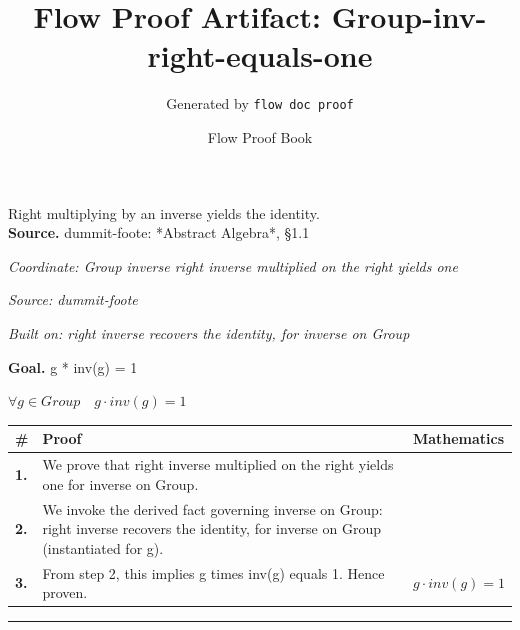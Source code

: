 \documentclass[11pt]{article}
\title{Flow Proof Artifact: Group-inv-right-equals-one}
\author{Generated by \texttt{flow doc proof}}
\date{Flow Proof Book}
\theoremstyle{definition}
\begin{document}
\maketitle
Right multiplying by an inverse yields the identity.\\[0.5em]
\textbf{Source.} dummit-foote: *Abstract Algebra*, §1.1\\[0.5em]
\bigskip
{}\par
\smallskip\noindent\textit{Coordinate: Group \cdot inverse \cdot right inverse multiplied on the right yields one}\par
\smallskip\noindent\textit{Source: dummit-foote}\par
\smallskip\noindent\textit{Built on: right inverse recovers the identity, for inverse on Group}\par
\medskip
\noindent\textbf{Goal.} g * inv(g) = 1\par
\noindent$\displaystyle \forall g \in Group\quad g \cdot inv(g) = 1$\par
\medskip
\noindent
\begin{tabular}{@{} >{\raggedright\arraybackslash}p{} >{\raggedright\arraybackslash}p{} >{\raggedleft\arraybackslash}p{} @{}}
\textbf{\#} & \textbf{Proof} & \textbf{Mathematics} \\
\midrule
\textbf{1.} & We prove that right inverse multiplied on the right yields one for inverse on Group. & \\[0.45em]
\textbf{2.} & We invoke the derived fact governing inverse on Group: right inverse recovers the identity, for inverse on Group (instantiated for g). & \\[0.45em]
\textbf{3.} & From step 2, this implies g times inv(g) equals 1. Hence proven. & $\displaystyle g \cdot inv(g) = 1$ \\[0.45em]
\bottomrule
\end{tabular}
\label{thm:Group-inverse-right_inverse_multiplied_on_the_right_yields_one}
\par\medskip\hrule
\end{document}
